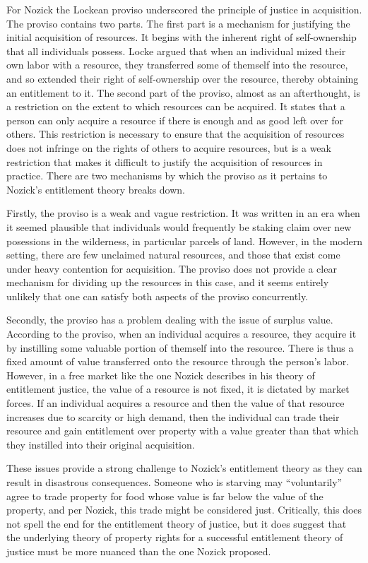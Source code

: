 For Nozick the Lockean proviso underscored the principle of justice in
acquisition. The proviso contains two parts. The first part is a mechanism for 
justifying the initial acquisition of resources. It begins with the inherent 
right of self-ownership that all individuals possess. Locke argued that when 
an individual mized their own labor with a resource, they transferred some of 
themself into the resource, and so extended their right of self-ownership over 
the resource, thereby obtaining an entitlement to it. The second part of the
proviso, almost as an afterthought, is a restriction on the extent to which 
resources can be acquired. It states that a person can only acquire a resource
if there is enough and as good left over for others. This restriction is
necessary to ensure that the acquisition of resources does not infringe on the
rights of others to acquire resources, but is a weak restriction that makes it
difficult to justify the acquisition of resources in practice. There are two 
mechanisms by which the proviso as it pertains to Nozick's entitlement theory 
breaks down.

Firstly, the proviso is a weak and vague restriction. It was written in an era 
when it seemed plausible that individuals would frequently be staking claim over
new posessions in the wilderness, in particular parcels of land. However, in the
modern setting, there are few unclaimed natural resources, and those that exist
come under heavy contention for acquisition. The proviso does not provide a
clear mechanism for dividing up the resources in this case, and it seems
entirely unlikely that one can satisfy both aspects of the proviso concurrently.

Secondly, the proviso has a problem dealing with the issue of surplus value. 
According to the proviso, when an individual acquires a resource, they acquire
it by instilling some valuable portion of themself into the resource. There is
thus a fixed amount of value transferred onto the resource through the person's
labor. However, in a free market like the one Nozick describes in his 
theory of entitlement justice, the value of a resource is not fixed, it is
dictated by market forces. If an individual acquires a resource and then the 
value of that resource increases due to scarcity or high demand, then the
individual can trade their resource and gain entitlement over property with a 
value greater than that which they instilled into their original acquisition.

These issues provide a strong challenge to Nozick's entitlement theory as they
can result in disastrous consequences. Someone who is starving may
``voluntarily'' agree to trade property for food whose value is far below the
value of the property, and per Nozick, this trade might be considered just. 
Critically, this does not spell the end for the entitlement theory of justice,
but it does suggest that the underlying theory of property rights for a
successful entitlement theory of justice must be more nuanced than the one
Nozick proposed.

